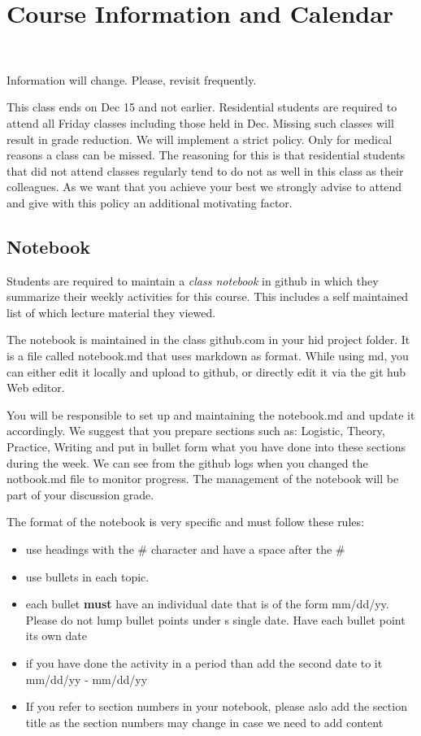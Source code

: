 

\section{Course Information and Calendar}\label{course-information-and-calendar}

\FILENAME\

Information will change. Please, revisit frequently.

This class ends on Dec 15 and not earlier. Residential students are
required to attend all Friday classes including those held in Dec.
Missing such classes will result in grade reduction. We will implement a
strict policy. Only for medical reasons a class can be missed. The
reasoning for this is that residential students that did not attend
classes regularly tend to do not as well in this class as their
colleagues. As we want that you achieve your best we strongly advise to
attend and give with this policy an additional motivating factor.

\subsection{Notebook}\label{notebook}

Students are required to maintain a \emph{class notebook} in github in
which they summarize their weekly activities for this course. This
includes a self maintained list of which lecture material they viewed.

The notebook is maintained in the class github.com in your hid project
folder. It is a file called notebook.md that uses markdown as format.
While using md, you can either edit it locally and upload to github, or
directly edit it via the git hub Web editor.

You will be responsible to set up and maintaining the notebook.md and
update it accordingly. We suggest that you prepare sections such as:
Logistic, Theory, Practice, Writing and put in bullet form what you have
done into these sections during the week. We can see from the github
logs when you changed the notbook.md file to monitor progress. The
management of the notebook will be part of your discussion grade.

The format of the notebook is very specific and must follow these rules:

\begin{itemize}

\item
  use headings with the \# character and have a space after the \#
\item
  use bullets in each topic.
\item
  each bullet \textbf{must} have an individual date that is of the form
  mm/dd/yy. Please do not lump bullet points under s single date. Have
  each bullet point its own date
\item
  if you have done the activity in a period than add the second date to
  it mm/dd/yy - mm/dd/yy
\item
  If you refer to section numbers in your notebook, please aslo add the
  section title as the section numbers may change in case we need to add
  content
\end{itemize}

